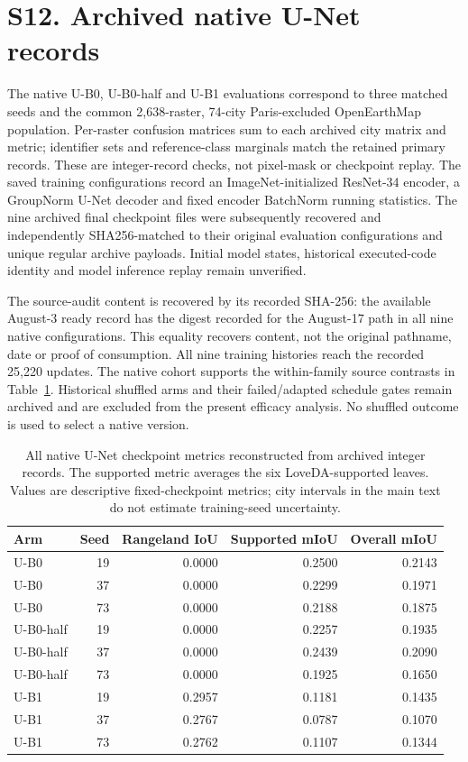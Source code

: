 \section*{S12. Archived native U-Net records}
The native U-B0, U-B0-half and U-B1 evaluations correspond to three matched seeds and the common 2,638-raster, 74-city Paris-excluded OpenEarthMap population. Per-raster confusion matrices sum to each archived city matrix and metric; identifier sets and reference-class marginals match the retained primary records. These are integer-record checks, not pixel-mask or checkpoint replay. The saved training configurations record an ImageNet-initialized ResNet-34 encoder, a GroupNorm U-Net decoder and fixed encoder BatchNorm running statistics. The nine archived final checkpoint files were subsequently recovered and independently SHA256-matched to their original evaluation configurations and unique regular archive payloads. Initial model states, historical executed-code identity and model inference replay remain unverified.

The source-audit content is recovered by its recorded SHA-256: the available August-3 ready record has the digest recorded for the August-17 path in all nine native configurations. This equality recovers content, not the original pathname, date or proof of consumption. All nine training histories reach the recorded 25,220 updates. The native cohort supports the within-family source contrasts in Table~\ref{tab:unet-native-supp}. Historical shuffled arms and their failed/adapted schedule gates remain archived and are excluded from the present efficacy analysis. No shuffled outcome is used to select a native version.

\begin{table}[H]
\centering
\caption{All native U-Net checkpoint metrics reconstructed from archived integer records. The supported metric averages the six LoveDA-supported leaves. Values are descriptive fixed-checkpoint metrics; city intervals in the main text do not estimate training-seed uncertainty.}
\label{tab:unet-native-supp}
\small
\begin{tabular*}{\linewidth}{@{\extracolsep{\fill}}lrrrr@{}}
\toprule
Arm & Seed & Rangeland IoU & Supported mIoU & Overall mIoU \\
\midrule
U-B0 & 19 & 0.0000 & 0.2500 & 0.2143 \\
U-B0 & 37 & 0.0000 & 0.2299 & 0.1971 \\
U-B0 & 73 & 0.0000 & 0.2188 & 0.1875 \\
U-B0-half & 19 & 0.0000 & 0.2257 & 0.1935 \\
U-B0-half & 37 & 0.0000 & 0.2439 & 0.2090 \\
U-B0-half & 73 & 0.0000 & 0.1925 & 0.1650 \\
U-B1 & 19 & 0.2957 & 0.1181 & 0.1435 \\
U-B1 & 37 & 0.2767 & 0.0787 & 0.1070 \\
U-B1 & 73 & 0.2762 & 0.1107 & 0.1344 \\
\bottomrule
\end{tabular*}
\end{table}

